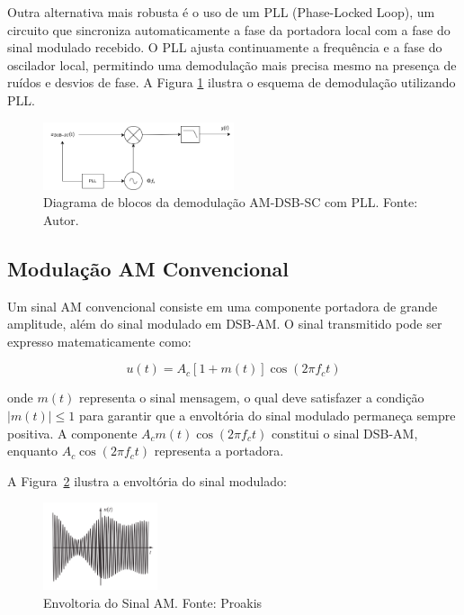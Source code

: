 Outra alternativa mais robusta é o uso de um PLL (Phase-Locked Loop), um circuito que sincroniza automaticamente a fase da portadora local com a fase do sinal modulado recebido. O PLL ajusta continuamente a frequência e a fase do oscilador local, permitindo uma demodulação mais precisa mesmo na presença de ruídos e desvios de fase. A Figura \ref{fig:demodulacao_am_pll} ilustra o esquema de demodulação utilizando PLL.

\begin{figure}[h]
    \centering
    \includegraphics[width=0.5\textwidth]{images/demodulacao_am_pll.png}
    \caption{Diagrama de blocos da demodulação AM-DSB-SC com PLL. Fonte: Autor.}
    \label{fig:demodulacao_am_pll}
    \centering
\end{figure}

\subsection{Modulação AM Convencional}

Um sinal AM convencional consiste em uma componente portadora de grande amplitude, além do sinal modulado em DSB-AM. O sinal transmitido pode ser expresso matematicamente como:

\begin{equation}
u(t) = A_c[1 + m(t)] \cos(2\pi f_c t)
\end{equation}

onde $m(t)$ representa o sinal mensagem, o qual deve satisfazer a condição $|m(t)| \leq 1$ para garantir que a envoltória do sinal modulado permaneça sempre positiva. A componente $A_c m(t) \cos(2\pi f_c t)$ constitui o sinal DSB-AM, enquanto $A_c \cos(2\pi f_c t)$ representa a portadora.

A Figura~\ref{fig:am_envoltoria} ilustra a envoltória do sinal modulado:

\begin{figure}[h]
    \centering
    \includegraphics[width=0.3\textwidth]{images/envoltoria.png}
    \caption{Envoltoria do Sinal AM. Fonte: Proakis}
    \label{fig:am_envoltoria}
    \centering
\end{figure}

